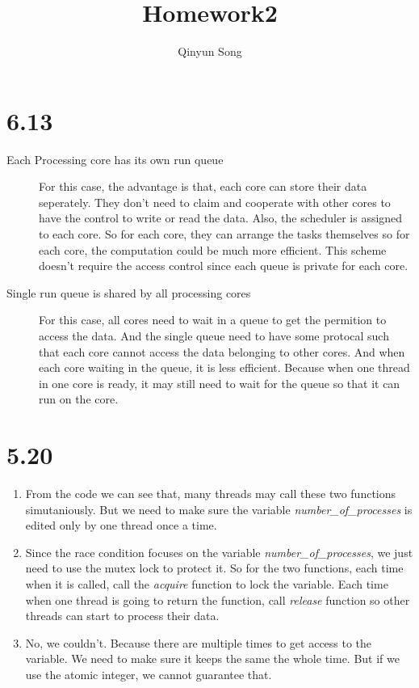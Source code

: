 \documentclass{article}
\title{Homework2}
\author{Qinyun Song}
\date{}
\begin{document}
    \maketitle

    \section{6.13}
	\begin{description}
    	\item [Each Processing core has its own run queue]
	    For this case, the advantage is that, each core can store their data seperately. They don't need to claim and cooperate with other cores to have the control to write or read the data. Also, the scheduler is assigned to each core. So for each core, they can arrange the tasks themselves so for each core, the computation could be much more efficient. This scheme doesn't require the access control since each queue is private for each core.
	\item [Single run queue is shared by all processing cores]
	    For this case, all cores need to wait in a queue to get the permition to access the data. And the single queue need to have some protocal such that each core cannot access the data belonging to other cores. And when each core waiting in the queue, it is less efficient. Because when one thread in one core is ready, it may still need to wait for the queue so that it can run on the core.
	\end{description}

    \section{5.20}
	\begin{enumerate}
	\item From the code we can see that, many threads may call these two functions simutaniously. But we need to make sure the variable \emph{number_of_processes} is edited only by one thread once a time.
	\item Since the race condition focuses on the variable \emph{number_of_processes}, we just need to use the mutex lock to protect it. So for the two functions, each time when it is called, call the \emph{acquire} function to lock the variable. Each time when one thread is going to return the function, call \emph{release} function so other threads can start to process their data.
	\item No, we couldn't. Because there are multiple times to get access to the variable. We need to make sure it keeps the same the whole time. But if we use the atomic integer, we cannot guarantee that.
	\end{enumerate}
\end{document}
